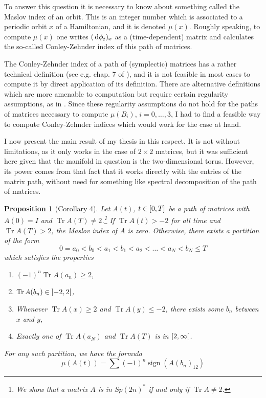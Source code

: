 \documentclass[11pt, a4paper]{article}
\newtheorem{prop}{Proposition}
\theoremstyle{nonumberplain}
\DeclareMathOperator{\trace}{Tr}
\DeclareMathOperator{\sign}{sign}
\begin{document}
To answer this question it is necessary to know about something called the Maslov index of an orbit. This is an integer number which is associated to a periodic orbit $x$ of a Hamiltonian, and it is denoted $\mu(x)$. Roughly speaking, to compute $\mu(x)$ one writes $(\dl \phi_t)_x$ as a (time-dependent) matrix and calculates the so-called Conley-Zehnder index of this path of matrices.

The Conley-Zehnder index of a path of (symplectic) matrices has a rather technical definition (see e.g. chap. 7 of \cite{audin}), and it is not feasible in most cases to compute it by direct application of its definition. There are alternative definitions which are more amenable to computation but require certain regularity assumptions, as in \cite{robbin1993maslov}. Since these regularity assumptions do not hold for the paths of matrices necessary to compute $\mu(B_i)$, $i = 0,\dots, 3$, I had to find a feasible way to compute Conley-Zehnder indices which would work for the case at hand.

I now present the main result of my thesis in this respect. It is not without limitations, as it only works in the case of $2 \times 2$ matrices, but it was sufficient here given that the manifold in question is the two-dimensional torus. However, its power comes from that fact that it works directly with the entries of the matrix path, without need for something like spectral decomposition of the path of matrices.

\begin{prop}[Corollary 4]
Let $A(t)$, $t \in \interval 0 T$ be a path of matrices with $A(0) = I$ and $\trace A(T) \neq 2$.\footnote{We show that a matrix $A$ is in $Sp(2n)^*$ if and only if $\trace A \neq 2$.} If $\trace A(t) > -2$ for all time and $\trace A(T) > 2$, the Maslov index of $A$ is zero. Otherwise, there exists a partition of the form
\begin{equation}
0 = a_0 < b_0 < a_1 < b_1 < a_2 < \dots < a_N < b_N \leq T
\end{equation}
which satisfies the properties
\begin{enumerate}
\item $(-1)^n \trace A(a_n) \geq 2$,
\item $\trace A(b_n) \in \ointerval{-2}2$,
\item Whenever $\trace A(x) \geq 2$ and $\trace A(y) \leq -2$, there exists some $b_n$ between $x$ and $y$,
\item\label{calcmaslov:ab5} Exactly one of $\trace A(a_N)$ and $\trace A(T)$ is in $\rinterval 2 \infty$.
\end{enumerate}

For any such partition, we have the formula
\begin{equation}\label{calcmaslov:mu}
\mu(A(t)) = \sum (-1)^n \sign(A(b_n)_{12})
\end{equation}
\end{prop}
\end{document}
